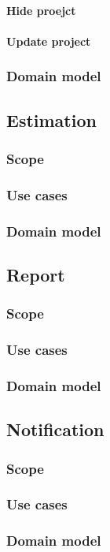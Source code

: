 \paragraph{Hide proejct}
\paragraph{Update project}
\subsubsection{Domain model}
\subsection{Estimation}
\subsubsection{Scope}
\subsubsection{Use cases}
\subsubsection{Domain model}
\subsection{Report}
\subsubsection{Scope}
\subsubsection{Use cases}
\subsubsection{Domain model}
\subsection{Notification}
\subsubsection{Scope}
\subsubsection{Use cases}
\subsubsection{Domain model}

